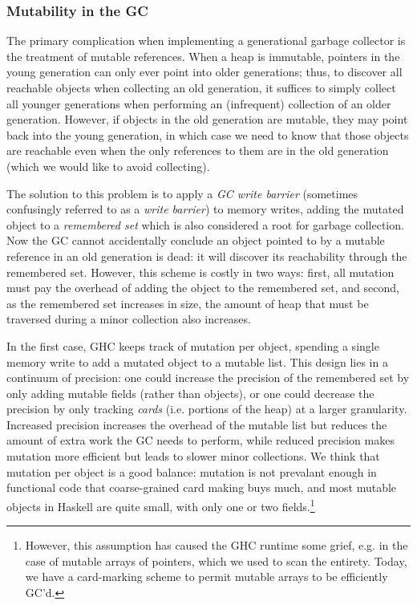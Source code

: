 \subsubsection{Mutability in the GC}

The primary complication when implementing a generational garbage
collector is the treatment of mutable references.  When a heap is
immutable, pointers in the young generation can only ever point into
older generations; thus, to discover all reachable objects when
collecting an old generation, it suffices to simply collect all younger
generations when performing an (infrequent) collection of an older
generation.  However, if objects in the old generation are mutable, they
may point back into the young generation, in which case we need to know
that those objects are reachable even when the only references to them
are in the old generation (which we would like to avoid collecting).

The solution to this problem is to apply a \emph{GC write barrier}
(sometimes confusingly referred to as a \emph{write barrier}) to memory
writes, adding the mutated object to a \emph{remembered set} which is
also considered a root for garbage collection.  Now the GC cannot
accidentally conclude an object pointed to by a mutable reference in an
old generation is dead: it will discover its reachability through the
remembered set.  However, this scheme is costly in two ways: first, all
mutation must pay the overhead of adding the object to the remembered
set, and second, as the remembered set increases in size, the amount of
heap that must be traversed during a minor collection also increases.

In the first case, GHC keeps track of mutation per object, spending a
single memory write to add a mutated object to a mutable list.  This
design lies in a continuum of precision: one could increase the
precision of the remembered set by only adding mutable fields (rather
than objects), or one could decrease the precision by only tracking
\emph{cards} (i.e. portions of the heap) at a larger granularity.
Increased precision increases the overhead of the mutable list but
reduces the amount of extra work the GC needs to perform, while reduced
precision makes mutation more efficient but leads to slower minor
collections.  We think that mutation per object is a good balance: mutation
is not prevalant enough in functional code that coarse-grained card making
buys much, and most mutable objects in Haskell are quite small, with only
one or two fields.\footnote{However, this assumption has caused the GHC runtime
some grief, e.g. in the case of mutable arrays of pointers, which we used to
scan the entirety.  Today, we have a card-marking scheme to permit mutable
arrays to be efficiently GC'd.}

